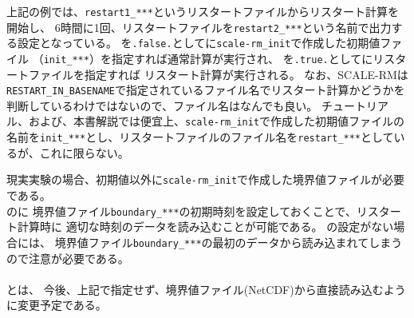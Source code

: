 上記の例では、\verb|restart1_***|というリスタートファイルからリスタート計算を開始し、
6時間に1回、リスタートファイルを\verb|restart2_***|という名前で出力する設定となっている。
を\verb|.false.|としてに\verb|scale-rm_init|で作成した初期値ファイル
（\verb|init_***|）を指定すれば通常計算が実行され、
を\verb|.true.|としてにリスタートファイルを指定すれば
リスタート計算が実行される。
なお、SCALE-RMは\verb|RESTART_IN_BASENAME|で指定されているファイル名でリスタート計算かどうかを判断しているわけではないので、ファイル名はなんでも良い。
チュートリアル、および、本書解説では便宜上、\verb|scale-rm_init|で作成した初期値ファイルの名前を\verb|init_***|とし、リスタートファイルのファイル名を\verb|restart_***|としているが、これに限らない。


現実実験の場合、初期値以外に\verb|scale-rm_init|で作成した境界値ファイルが必要である。\\
のに
境界値ファイル\verb|boundary_***|の初期時刻を設定しておくことで、リスタート計算時に
適切な時刻のデータを読み込むことが可能である。
の設定がない場合には、
境界値ファイル\verb|boundary_***|の最初のデータから読み込まれてしまうので注意が必要である。\\

\\

とは、
今後、上記で指定せず、境界値ファイル(NetCDF)から直接読み込むように変更予定である。

